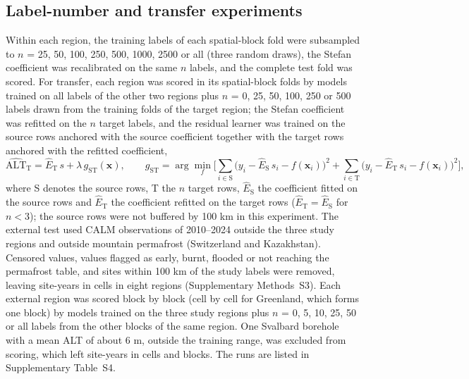 \subsection{Label-number and transfer experiments}
Within each region, the training labels of each spatial-block fold were subsampled to $n$ = 25, 50, 100, 250, 500, 1000, 2500 or all (three random draws), the Stefan coefficient was recalibrated on the same $n$ labels, and the complete test fold was scored. For transfer, each region was scored in its spatial-block folds by models trained on all labels of the other two regions plus $n$ = 0, 25, 50, 100, 250 or 500 labels drawn from the training folds of the target region; the Stefan coefficient was refitted on the $n$ target labels, and the residual learner was trained on the source rows anchored with the source coefficient together with the target rows anchored with the refitted coefficient,
\begin{equation}
\widehat{\mathrm{ALT}}_{\mathrm{T}} = \hat{E}_{\mathrm{T}}\, s + \lambda\, g_{\mathrm{ST}}(\mathbf{x}), \qquad
g_{\mathrm{ST}} = \arg\min_{f} \Big[ \sum_{i \in \mathrm{S}} \big( y_i - \hat{E}_{\mathrm{S}}\, s_i - f(\mathbf{x}_i) \big)^{2} + \sum_{i \in \mathrm{T}} \big( y_i - \hat{E}_{\mathrm{T}}\, s_i - f(\mathbf{x}_i) \big)^{2} \Big],
\label{eq:transfer}
\end{equation}
where S denotes the source rows, T the $n$ target rows, $\hat{E}_{\mathrm{S}}$ the coefficient fitted on the source rows and $\hat{E}_{\mathrm{T}}$ the coefficient refitted on the target rows ($\hat{E}_{\mathrm{T}} = \hat{E}_{\mathrm{S}}$ for $n < 3$); the source rows were not buffered by 100 km in this experiment. The external test used CALM observations of 2010--2024\cite{Streletskiy2025} outside the three study regions and outside mountain permafrost (Switzerland and Kazakhstan). Censored values, values flagged as early, burnt, flooded or not reaching the permafrost table, and sites within 100 km of the study labels were removed, leaving \nextcy{} site-years in \nextcells{} cells in eight regions (Supplementary Methods~S3). Each external region was scored block by block (cell by cell for Greenland, which forms one block) by models trained on the three study regions plus $n$ = 0, 5, 10, 25, 50 or all labels from the other blocks of the same region. One Svalbard borehole with a mean ALT of about 6 m, outside the training range, was excluded from scoring, which left \nftScoredRows{} site-years in \nftScoredCells{} cells and \nftScoredBlocks{} blocks. The runs are listed in Supplementary Table~S4.

